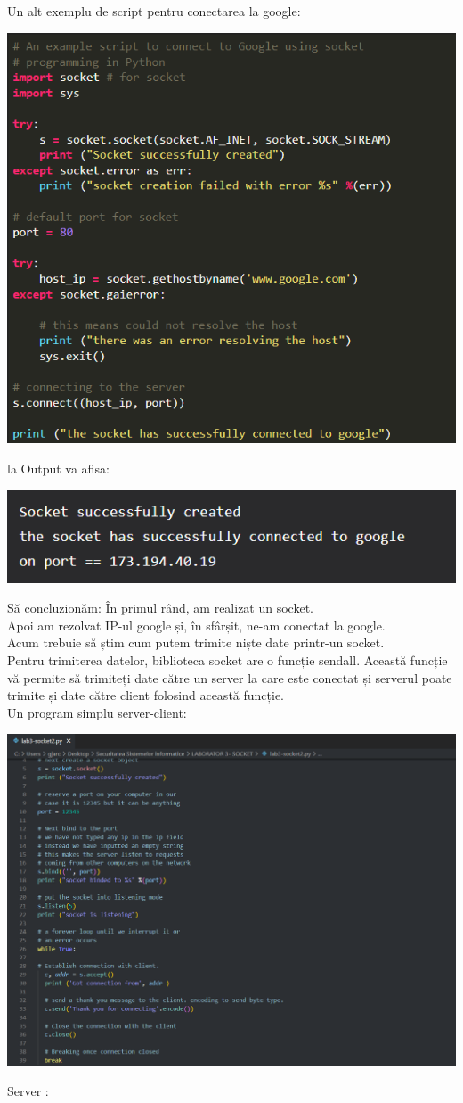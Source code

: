 \documentclass[oneside,20pt]{article}          %
\begin{document}
Un alt exemplu de script pentru conectarea la google:


\begin{center}
\includegraphics[height = 6 cm]{1.png}
\end{center}
la Output va afisa:
\begin{center}
\includegraphics[height = 1 cm]{2.png}
\end{center}

 Să concluzionăm: În primul rând, am realizat un socket.\\
Apoi am rezolvat IP-ul google și, în sfârșit, ne-am conectat la google.\\
Acum trebuie să știm cum putem trimite niște date printr-un socket.\\
Pentru trimiterea datelor, biblioteca socket are o funcție sendall. Această funcție vă permite să trimiteți date către un server la care este conectat și serverul poate trimite și date către client folosind această funcție.\\
Un program simplu server-client:\\

 \begin{center}
\includegraphics[height = 5 cm]{3.png}
\end{center}
Server :
\end{document}
